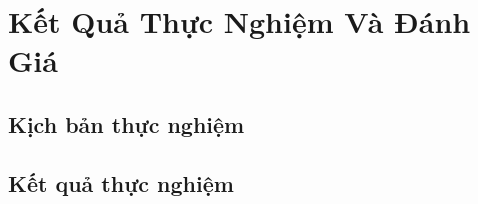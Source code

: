 \chapter{Kết Quả Thực Nghiệm Và Đánh Giá}
\section{Kịch bản thực nghiệm}

\newpage
\section{Kết quả thực nghiệm}


